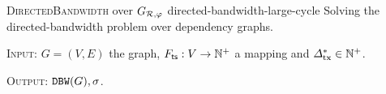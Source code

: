 \begin{cccAlgorithm}
    {\textsc{DirectedBandwidth} over $G_{\mathcal{R}, \varphi}$}
    {directed-bandwidth-large-cycle}
    {Solving the directed-bandwidth problem over dependency graphs.}

    \textsc{Input:} $G = (V, E)$ the graph, $F_{\mathsf{ts}}: V \rightarrow
        \mathbb{N}^+$ a mapping and $\varDelta_{\mathrm{tx}}^* \in \mathbb{N}^+$.

    \begin{algorithmic}[1]
        
        \EndIf
        \EndFor
        
        \EndIf
        \EndFor
    \end{algorithmic}

    \textsc{Output:} $\mathtt{DBW}(G), \sigma$.
\end{cccAlgorithm}